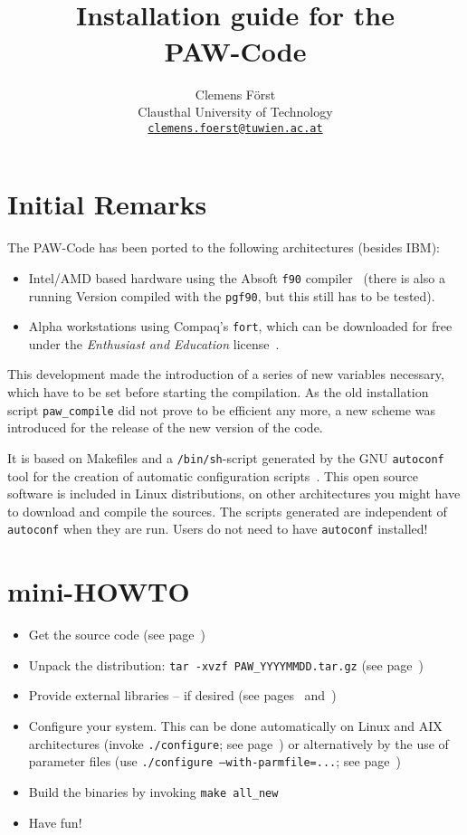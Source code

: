 \documentclass[a4paper,10pt]{article}
\title{\hrulefill \\ {\Large \bf Installation guide for the \\} 
                  {\Huge \bf PAW-Code} \\ \vspace*{-0.3cm} \hrulefill}
\author{\small  Clemens F\"orst \\ 
        \small Clausthal University of Technology \\ 
        \small \underline{\texttt{clemens.foerst@tuwien.ac.at}}}
\date{}
\begin{document}
\maketitle
\tableofcontents

\section{Initial Remarks}

The \textsc{PAW}-Code has been ported to the following architectures (besides IBM):
\begin{itemize}
\item Intel/AMD based hardware using the Absoft \texttt{f90}
  compiler~\cite{f90} (there is also a running Version compiled with the
\texttt{pgf90}, but this still has to be tested).  
\item Alpha workstations using Compaq's \texttt{fort},
  which can be downloaded for free under the \textit{Enthusiast and Education}
  license~\cite{fort}.
\end{itemize}
This development made the introduction of a series of new variables necessary,
which have to be set before starting the compilation.  As the old installation
script \texttt{paw\_compile} did not prove to be efficient any more, a new
scheme was introduced for the release of the new version of the code.

It is based on Makefiles and a \texttt{/bin/sh}-script generated by the GNU
\texttt{autoconf} tool for the creation of automatic configuration
scripts~\cite{autoconf,autoconf2}.  This open source software is included in
Linux distributions, on other architectures you might have to download and
compile the sources.  The scripts generated are independent of
\texttt{autoconf} when they are run. Users do not need to have
\texttt{autoconf} installed!


\section{mini-HOWTO}

\begin{itemize}
\item Get the source code (see page~\pageref{sub:pre})
\item Unpack the distribution: \texttt{tar -xvzf PAW\_YYYYMMDD.tar.gz} (see
page~\pageref{sub:unpack})
\item Provide external libraries -- if desired (see pages~\pageref{sub:libs}
and~\pageref{sec:libs})
\item Configure your system. This can be done automatically on Linux and AIX
architectures (invoke \texttt{./configure}; see page~\pageref{sub:auto}) or
alternatively by the use of parameter files (use \texttt{./configure
--with-parmfile=...}; see page~\pageref{sub:parms})
\item Build the binaries by invoking \texttt{make all\_new}
\item Have fun!
\end{itemize}
\end{document}
